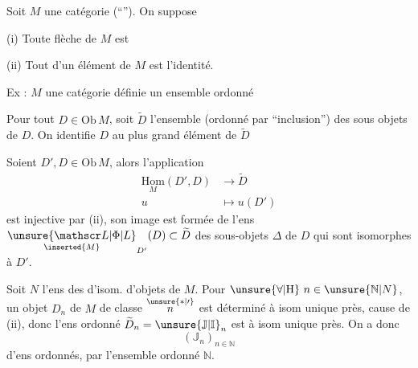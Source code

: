 
Soit \(M\) une catégorie (``''). On suppose

(i) Toute flèche de \(M\) est 

(ii) Tout  d'un élément de \(M\) est l'identité.

Ex : \(M\) une catégorie définie  un ensemble ordonné

Pour tout \(D\in\mathrm{Ob}\,M\), soit \(\widetilde D\) l'ensemble (ordonné par ``inclusion'') des sous objets de \(D\). On identifie \(D\) au plus grand élément de \(\widetilde D\)

Soient \(D',D\in\mathrm{Ob}\,M\), alors l'application
\begingroup\makeatletter\tagsleft@true\makeatother
\[
\begin{aligned}
\underset{M}{\mathrm{Hom}}(D',D)&\longrightarrow\widetilde D\\
u&\longmapsto u(D')
\end{aligned}
\tag*{(\(\ast\))}
\]
\endgroup
est injective par (ii), son image est formée de l'ens 
\(\underset{\inserted{M}}{\unsure{\mathscr L|\Phi|L}}_{D'}(D)\subset\widetilde D\)
des sous-objets \(\Delta\) de \(D\) qui sont isomorphes à \(D'\).


Soit \(N\) l'ens  des  d'isom. d'objets de \(M\). 
Pour \(\unsure{\forall|\mathrm H}\ n\in\unsure{\mathbb N|N}\), un objet \(D_n\) de \(M\) de classe \(\overset{\unsure{\ast|\prime}}{n}\) est déterminé à isom unique près,  cause de (ii), donc l'ens ordonné \(\widetilde D_n=\unsure{\mathbb J|\mathbb I}_n\) est  à isom unique près. On a donc  
\[
(\mathbb J_n)_{n\in\mathbb N}
\]
d'ens ordonnés,  par l'ensemble ordonné \(\mathbb N\).
